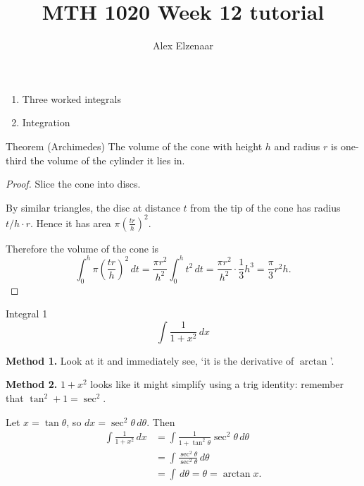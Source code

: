 \documentclass{beamer}
\title{MTH 1020 Week 12 tutorial}
\author{Alex Elzenaar}
\begin{document}
\begin{frame}{\inserttitle}
\begin{enumerate}
  \item Three worked integrals
  \item Integration
\end{enumerate}
\end{frame}

\begin{frame}
  \begin{block}{Theorem (Archimedes)}
    The volume of the cone with height $ h $ and radius $ r $ is one-third the volume of the cylinder it lies in.
  \end{block}
  \begin{proof}
    Slice the cone into discs.

    By similar triangles, the disc at distance $ t $ from the tip of the cone has radius $ t/h \cdot r $. Hence it has area $ \pi (\frac{tr}{h})^2 $.

    Therefore the volume of the cone is
    \begin{displaymath}
      \int_{0}^h \pi \left(\frac{tr}{h}\right)^2 \,dt = \frac{\pi r^2}{h^2} \int_0^h t^2\,dt = \frac{\pi r^2}{h^2} \cdot \frac{1}{3} h^3 = \frac{\pi}{3} r^2 h.
    \end{displaymath}
  \end{proof}
\end{frame}

\begin{frame}
  \begin{block}{Integral 1}
    \begin{displaymath}
      \int \frac{1}{1+x^2} \, dx
    \end{displaymath}
  \end{block}
  \pause
  \textbf{Method 1.} Look at it and immediately see, `it is the derivative of $\arctan$'.

  \pause\vspace{1ex}

  \textbf{Method 2.} $ 1+x^2 $ looks like it might simplify using a trig identity: remember that $ \tan^2 + 1 = \sec^2 $.

  \pause
  Let $ x = \tan \theta $, so $ dx = \sec^2 \theta \, d\theta$. \pause Then
  \begin{align*}
    \int \frac{1}{1+x^2} \, dx &= \int \frac{1}{1+\tan^2 \theta} \sec^2 \theta  \, d\theta \\
                               &= \int \frac{\sec^2 \theta}{\sec^2 \theta}  \, d\theta \\
                               &= \int\, d\theta = \theta = \arctan x.
  \end{align*}
\end{frame}
\end{document}
